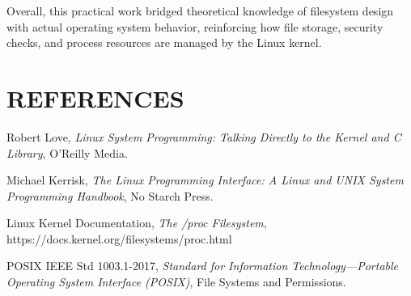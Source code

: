 \documentclass[12pt,a4paper]{report}
\numberwithin{equation}{chapter}
\numberwithin{figure}{chapter}
\numberwithin{table}{chapter}
\begin{document}
Overall, this practical work bridged theoretical knowledge of filesystem design with actual operating system behavior, reinforcing how file storage, security checks, and process resources are managed by the Linux kernel.

\chapter*{REFERENCES}

\noindent [1] Robert Love, \textit{Linux System Programming: Talking Directly to the Kernel and C Library}, O'Reilly Media.

\noindent [2] Michael Kerrisk, \textit{The Linux Programming Interface: A Linux and UNIX System Programming Handbook}, No Starch Press.

\noindent [3] Linux Kernel Documentation, \textit{The /proc Filesystem}, https://docs.kernel.org/filesystems/proc.html

\noindent [4] POSIX IEEE Std 1003.1-2017, \textit{Standard for Information Technology---Portable Operating System Interface (POSIX)}, File Systems and Permissions.
\end{document}
